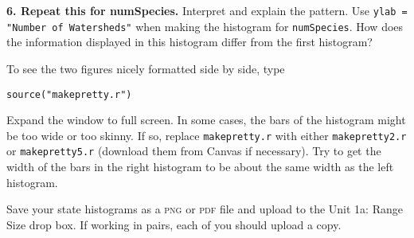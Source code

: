 \documentclass[11pt]{article}
\begin{document}
\vspace{7\baselineskip}


\textbf{6. Repeat this for numSpecies.} Interpret and explain the pattern. 
Use \texttt{ylab = "Number of Watersheds"} when making the histogram for \texttt{numSpecies}.
How does the information displayed in this histogram differ from the first histogram?

\vspace{7\baselineskip}

To see the two figures nicely formatted side by side, type


\texttt{source("makepretty.r")}

Expand the window to full screen. In some cases, the bars of the histogram might be too wide or too skinny. If so, replace \texttt{makepretty.r} with either \texttt{makepretty2.r} or \texttt{makepretty5.r} (download them from Canvas if necessary). Try to get the width of the bars in the right histogram to be about the same width as the left histogram.

Save your state histograms as a \textsc{png} or \textsc{pdf} file and upload to the Unit 1a: Range Size drop box. If working in pairs, each of you should upload a copy.
\end{document}
